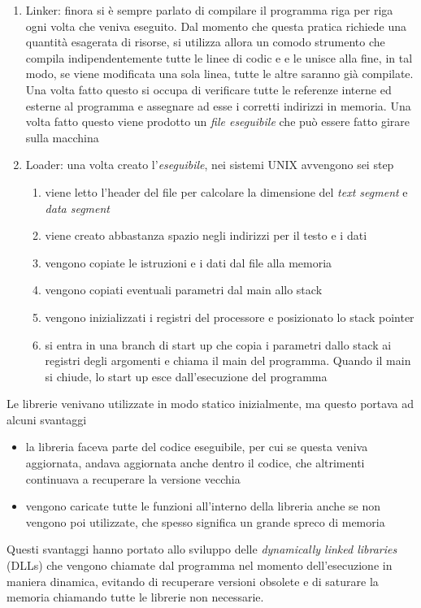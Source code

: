 \documentclass[a4paper,12pt]{article}
\theoremstyle{break}
\numberwithin{equation}{section}
\begin{document}
\begin{enumerate}
\begin{enumerate}
    \end{enumerate}
    \item Linker: finora si è sempre parlato di compilare il programma riga per riga ogni volta che veniva eseguito. Dal momento che questa pratica richiede una quantità esagerata di risorse, si utilizza allora un comodo strumento che compila indipendentemente tutte le linee di codic e e le unisce alla fine, in tal modo, se viene modificata una sola linea, tutte le altre saranno già compilate. Una volta fatto questo si occupa di verificare tutte le referenze interne ed esterne al programma e assegnare ad esse i corretti indirizzi in memoria. Una volta fatto questo viene prodotto un \textit{file eseguibile} che può essere fatto girare sulla macchina
    \item Loader: una volta creato l'\textit{eseguibile}, nei sistemi UNIX avvengono sei step
    \begin{enumerate}
        \item viene letto l'header del file per calcolare la dimensione del \textit{text segment} e \textit{data segment}
        \item viene creato abbastanza spazio negli indirizzi per il testo e i dati
        \item vengono copiate le istruzioni e i dati dal file alla memoria
        \item vengono copiati eventuali parametri dal main allo stack
        \item vengono inizializzati i registri del processore e posizionato lo stack pointer
        \item si entra in una branch di start up che copia i parametri dallo stack ai registri degli argomenti e chiama il main del programma. Quando il main si chiude, lo start up esce dall'esecuzione del programma
    \end{enumerate}
\end{enumerate}
Le librerie venivano utilizzate in modo statico inizialmente, ma questo portava ad alcuni svantaggi
\begin{itemize}
    \item la libreria faceva parte del codice eseguibile, per cui se questa veniva aggiornata, andava aggiornata anche dentro il codice, che altrimenti continuava a recuperare la versione vecchia
    \item vengono caricate tutte le funzioni all'interno della libreria anche se non vengono poi utilizzate, che spesso significa un grande spreco di memoria
\end{itemize}
Questi svantaggi hanno portato allo sviluppo delle \textit{dynamically linked libraries} (DLLs) che vengono chiamate dal programma nel momento dell'esecuzione in maniera dinamica, evitando di recuperare versioni obsolete e di saturare la memoria chiamando tutte le librerie non necessarie.  
\end{document}
